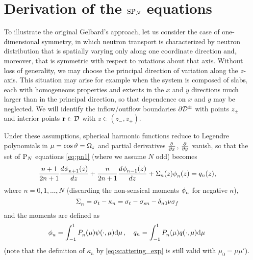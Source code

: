 \section{Derivation of the $\SPN$ equations}
To illustrate the original Gelbard's approach, let us consider the case of one-dimensional symmetry, in which neutron
transport is characterized by neutron distribution that is spatially varying only along one coordinate direction and,
moreover, that is symmetric with respect to rotations about that axis. Without loss of generality, we may choose the
principal direction of variation along the $z$-axis. This situation may arise for example when the system is composed of
slabs, each with homogeneous properties and extents in the $x$ and $y$ directions much larger than in the principal
direction, so that dependence on $x$ and $y$ may be neglected. We will identify the inflow/outflow boundaries $\pV[\pm]$
with points $z_{\pm}$ and interior points $\br\in\VV$ with $z\in (z_-, z_+)$.

Under these assumptions, spherical harmonic functions
reduce to Legendre polynomials in $\mu = \cost = \Omega_z$ and partial derivatives $\pd{}{x}$, $\pd{}{y}$ vanish, so that the set of $\PN$ equations
\eqref{eq:pn1} (where we assume $N$ odd) becomes
\begin{equation}
    \label{eq:PN1d}
\frac{n+1}{2n+1}\der{\angmom{n+1}{}(z)}{z} + \frac{n}{2n +1}\der{\angmom{n-1}{}(z)}{z} + \Sigma_n(z)\angmom{n}{}(z) =
q_n(z),
\end{equation}
where $n = 0,1,\ldots, N$ (discarding the non-sensical moments $\angmom{n}{}$ for negative $n$),
$$
\Sa{n} = \sigma_t - \kappa_n = \sigma_t - \sigma_{sn} - \kron{n}{0}\nu\sigma_f
$$
and the moments are defined as
$$
\angmom{n}{} = \muint{\P{n}{}(\mu)\angflux(\cdot,\mu)},\quad q_n = \muint{\P{n}{}(\mu)q(\cdot,\mu)}
$$
(note that the definition of $\kappa_{n}$ by \eqref{eq:scattering_exp} is still valid with $\mu_0 = \mu\mu'$). 

